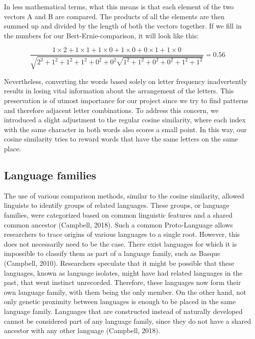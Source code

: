 
In less mathematical terms, what this means is that each element of the two vectors A and B are compared. The products of all the elements are then summed up and divided by the length of both the vectors together. If we fill in the numbers for our Bert-Ernie-comparison, it will look like this: 

{\footnotesize
	\[
	\frac{1 \times 2 + 1 \times 1 + 1 \times 0 + 1 \times 0 + 0 \times 1 + 1 \times 0}{\sqrt{2^2 + 1^2 + 1^2 + 1^2 + 0^2 + 0^2 \sqrt{1^2 + 1^2 + 0^2 + 0^2 + 1^2 + 1^2}}} = 0.56
\]
}

Nevertheless, converting the words based solely on letter frequency inadvertently results in losing vital information about the arrangement of the letters. This preservation is of utmost importance for our project since we try to find patterns and therefore adjacent letter combinations. To address this concern, we introduced a slight adjustment to the regular cosine similarity, where each index with the same character in both words also scores a small point. In this way, our cosine similarity tries to reward words that have the same letters on the same place.

\subsection{Language families}

The use of various comparison methods, similar to the cosine similarity, allowed linguists to identify groups of related languages. These groups, or language families, were categorized based on common linguistic features and a shared common ancestor (Campbell, 2018). Such a common Proto-Language allows researchers to trace origins of various languages to a single root. However, this does not necessarily need to be the case. There exist languages for which it is impossible to classify them as part of a language family, such as Basque (Campbell, 2010). Researchers speculate that it might be possible that these languages, known as language isolates, might have had related languages in the past, that went instinct unrecorded. Therefore, these languages now form their own language family, with them being the only member. On the other hand, not only genetic proximity between languages is enough to be placed in the same language family. Languages that are constructed instead of naturally developed cannot be considered part of any language family, since they do not have a shared ancestor with any other language (Campbell, 2018). 

